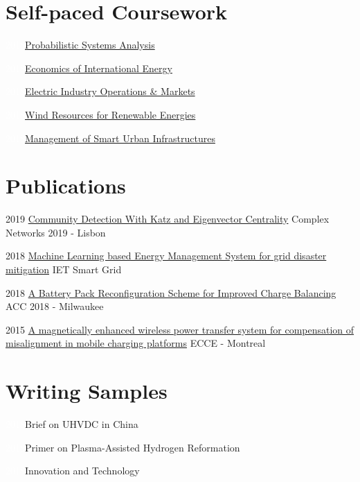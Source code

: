 \documentclass{tccv}
\begin{document}
\section{Self-paced Coursework}
\begin{factlist}
\item{\textcolor{white}{2018}}{\href{https://github.com/markditsworth/psa}{Probabilistic Systems Analysis}}
\item{\textcolor{white}{2018}}{\href{https://github.com/markditsworth/mds}{Economics of International Energy}}
\item{\textcolor{white}{2018}}{\href{https://github.com/markditsworth/mds}{Electric Industry Operations \& Markets}}
\item{\textcolor{white}{2018}}{\href{https://github.com/markditsworth/mds}{Wind Resources for Renewable Energies}}
\item{\textcolor{white}{2018}}{\href{https://github.com/markditsworth/mds}{Management of Smart Urban Infrastructures}}
\end{factlist}

\vspace{-15pt}
\section{Publications}
\begin{yearlist}
	\item{2019}
	{\href{https://github.com/markditsworth/CompleNet2019/blob/master/Presentation.pdf}{Community Detection With Katz and Eigenvector Centrality}}
	{Complex Networks 2019 - Lisbon}
	
	\item{2018}
	{\href{https://digital-library.theiet.org/content/journals/10.1049/iet-stg.2018.0043}{Machine Learning based Energy Management System for grid disaster mitigation}}
	{IET Smart Grid}
	
	\item{2018}
	{\href{https://ieeexplore.ieee.org/document/8431612}{A Battery Pack Reconfiguration Scheme for Improved Charge Balancing}}
	{ACC 2018 - Milwaukee}
	
	\item{2015}
	{\href{http://ieeexplore.ieee.org/document/7309840/}{A magnetically enhanced wireless power transfer system for compensation of misalignment in mobile charging platforms}}
	{ECCE - Montreal}
	
\end{yearlist}
\vspace{-25pt}

\section{Writing Samples}
\begin{factlist}
	\item{\textcolor{white}{2018}}{Brief on UHVDC in China}
	\item{\textcolor{white}{2018}}{Primer on Plasma-Assisted Hydrogen Reformation}
	\item{\textcolor{white}{2018}}{Innovation and Technology}
\end{factlist}
\end{document}
